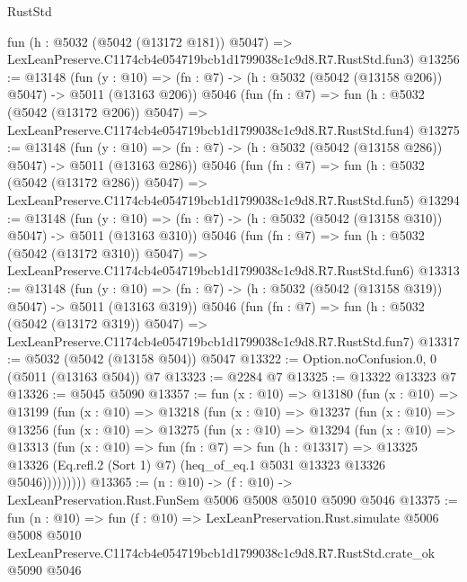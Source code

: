 \begin{lexlean}{RustStd}
\begin{coremodule}
    fun (h : @5032 (@5042 (@13172 @181)) @5047) =>
    LexLeanPreserve.C1174cb4e054719bcb1d1799038c1c9d8.R7.RustStd.fun3)
@13256 := @13148
    (fun (y : @10) => (fn : @7) -> (h : @5032 (@5042 (@13158 @206)) @5047) -> @5011 (@13163 @206))
    @5046
    (fun (fn : @7) =>
    fun (h : @5032 (@5042 (@13172 @206)) @5047) =>
    LexLeanPreserve.C1174cb4e054719bcb1d1799038c1c9d8.R7.RustStd.fun4)
@13275 := @13148
    (fun (y : @10) => (fn : @7) -> (h : @5032 (@5042 (@13158 @286)) @5047) -> @5011 (@13163 @286))
    @5046
    (fun (fn : @7) =>
    fun (h : @5032 (@5042 (@13172 @286)) @5047) =>
    LexLeanPreserve.C1174cb4e054719bcb1d1799038c1c9d8.R7.RustStd.fun5)
@13294 := @13148
    (fun (y : @10) => (fn : @7) -> (h : @5032 (@5042 (@13158 @310)) @5047) -> @5011 (@13163 @310))
    @5046
    (fun (fn : @7) =>
    fun (h : @5032 (@5042 (@13172 @310)) @5047) =>
    LexLeanPreserve.C1174cb4e054719bcb1d1799038c1c9d8.R7.RustStd.fun6)
@13313 := @13148
    (fun (y : @10) => (fn : @7) -> (h : @5032 (@5042 (@13158 @319)) @5047) -> @5011 (@13163 @319))
    @5046
    (fun (fn : @7) =>
    fun (h : @5032 (@5042 (@13172 @319)) @5047) =>
    LexLeanPreserve.C1174cb4e054719bcb1d1799038c1c9d8.R7.RustStd.fun7)
@13317 := @5032 (@5042 (@13158 @504)) @5047
@13322 := Option.noConfusion.{0, 0} (@5011 (@13163 @504)) @7
@13323 := @2284 @7
@13325 := @13322 @13323 @7
@13326 := @5045 @5090
@13357 := fun (x : @10) =>
  @13180
    (fun (x : @10) =>
    @13199
      (fun (x : @10) =>
      @13218
        (fun (x : @10) =>
        @13237
          (fun (x : @10) =>
          @13256
            (fun (x : @10) =>
            @13275
              (fun (x : @10) =>
              @13294
                (fun (x : @10) =>
                @13313
                  (fun (x : @10) =>
                  fun (fn : @7) =>
                  fun (h : @13317) =>
                  @13325
                    @13326
                    (Eq.refl.{2} (Sort 1) @7)
                    (heq_of_eq.{1} @5031 @13323 @13326 @5046)))))))))
@13365 := (n : @10) -> (f : @10) -> LexLeanPreservation.Rust.FunSem @5006 @5008 @5010 @5090 @5046
@13375 := fun (n : @10) =>
  fun (f : @10) =>
  LexLeanPreservation.Rust.simulate
    @5006
    @5008
    @5010
    LexLeanPreserve.C1174cb4e054719bcb1d1799038c1c9d8.R7.RustStd.crate_ok
    @5090
    @5046
\end{coremodule}
\end{lexlean}
